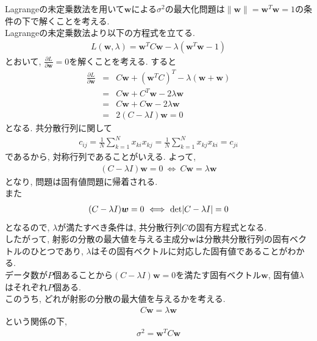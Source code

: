 \documentclass[dvipdfmx,a4j]{jsarticle}
\begin{document}
  Lagrangeの未定乗数法を用いて$\bm{w}$による$\sigma^{2}$の最大化問題は$\|\bm{w}\|=\bm{w}^{T}\bm{w}=1$の条件の下で解くことを考える.\\
  Lagrangeの未定乗数法より以下の方程式を立てる.
  \begin{eqnarray*}
    L(\bm{w},\lambda)=\bm{w}^{T}C\bm{w}-\lambda(\bm{w}^{T}\bm{w}-1)
  \end{eqnarray*}
  とおいて, $\displaystyle \frac{\partial L}{\partial \bm{w}}=0$を解くことを考える. すると
  \begin{eqnarray*}
    \frac{\partial L}{\partial \bm{w}}&=&C\bm{w}+(\bm{w}^{T}C)^{T}-\lambda(\bm{w}+\bm{w})\\
                                      &=&C\bm{w}+C^{T}\bm{w}-2\lambda \bm{w}\\
                                      &=&C\bm{w}+C\bm{w}-2\lambda \bm{w}\\
                                      &=&2(C-\lambda I)\bm{w} = 0
  \end{eqnarray*}
  となる. 共分散行列に関して
  \begin{eqnarray*}
    c_{ij}=\frac{1}{N}\sum_{k=1}^{N}x_{ki}x_{kj} = \frac{1}{N}\sum_{k=1}^{N}x_{kj}x_{ki} = c_{ji}
  \end{eqnarray*}
  であるから, 対称行列であることがいえる. よって,
  \begin{eqnarray*}
    (C-\lambda I)\bm{w} = 0 \ \Longleftrightarrow\ C\bm{w} = \lambda \bm{w}
  \end{eqnarray*}
  となり, 問題は固有値問題に帰着される.\\
  また
  \begin{eqnarray*}
    (C-\lambda I)\bm{w} = 0 \ \Longleftrightarrow\ {\rm det}|C-\lambda I|=0
  \end{eqnarray*}
  となるので, $\lambda$が満たすべき条件は, 共分散行列$C$の固有方程式となる.\\
  したがって, 射影の分散の最大値を与える主成分$\bm{w}$は分散共分散行列の固有ベクトルのひとつであり, $\lambda$はその固有ベクトルに対応した固有値であることがわかる.\\
  データ数が$P$個あることから$(C-\lambda I)\bm{w}=0$を満たす固有ベクトル$\bm{w}$, 固有値$\lambda$はそれぞれ$P$個ある.\\
  このうち, どれが射影の分散の最大値を与えるかを考える.
  \begin{eqnarray*}
    C\bm{w} = \lambda \bm{w}
  \end{eqnarray*}
  という関係の下,
  \begin{eqnarray*}
    \sigma^{2}=\bm{w}^{T}C\bm{w}
  \end{eqnarray*}
\end{document}
